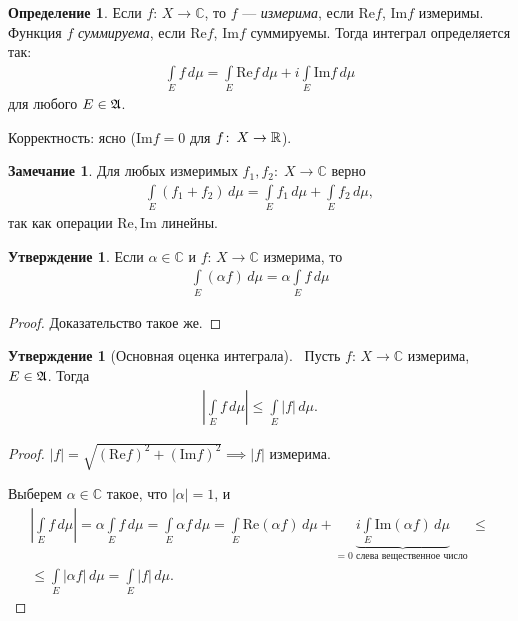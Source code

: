 \documentclass[a4paper,14pt]{extarticle}
\newcounter{theoremCnt}
\theoremstyle{definition}
\newtheorem{df}[theoremCnt]{Определение}
\theoremstyle{plain}
\theoremstyle{plain}
\theoremstyle{plain}
\theoremstyle{plain}
\theoremstyle{definition}
\theoremstyle{definition}
\newtheorem{remrk}[theoremCnt]{Замечание}
\theoremstyle{definition}
\newtheorem{claim}[theoremCnt]{Утверждение}
\theoremstyle{definition}
\theoremstyle{definition}
\theoremstyle{definition}
\theoremstyle{plain}
\theoremstyle{plain}
\theoremstyle{plain}
\theoremstyle{plain}
\theoremstyle{definition}
\theoremstyle{definition}
\theoremstyle{definition}
\theoremstyle{definition}
\theoremstyle{definition}
\newcommand{\R}{\ensuremath \mathbb{R}}
\newcommand{\A}{\ensuremath \mathfrak{A}}
\begin{document}
\begin{df}
 Если  $f \colon\, X \to \mathbb{C} $, то $f$ --- \textit{измерима}, если $\mathrm{Re} f$,  $\mathrm{Im} f$ измеримы. Функция  $f$ \textit{суммируема}, если $\mathrm{Re} f$,  $\mathrm{Im} f$ суммируемы. Тогда интеграл определяется так: \begin{align*}
  \int\limits_E f \, d\mu = \int\limits_E \mathrm{Re} f \, d\mu + i \int\limits_E \mathrm{Im} f \,d\mu
 \end{align*} для любого $E \in \A$.

 Корректность: ясно ($\mathrm{Im} f = 0$ для  $f \colon\, X \to \R  $).
\end{df}
\begin{remrk}
 Для любых измеримых $f_1, f_2 \colon\; X \to \mathbb{C}$ верно
 \begin{align*}
  \int\limits_E (f_1 + f_2) \, d\mu = \int\limits_E f_1 \,d\mu + \int\limits_E f_2 \,d\mu
 ,\end{align*}  так как операции $\mathrm{Re}, \mathrm{Im}$ линейны.
\end{remrk}
\begin{claim}
 Если $\alpha \in \mathbb{C}$ и $f \colon\, X \to \mathbb{C} $ измерима, то \begin{align*}
  \int\limits_E (\alpha f) \, d\mu = \alpha \int\limits_E f\,d\mu
 \end{align*} 
\end{claim}
\begin{proof}
 Доказательство такое же.
\end{proof}
\begin{claim}[Основная оценка интеграла]\
 Пусть $f \colon\, X \to \mathbb{C} $ измерима, $E \in \A$. Тогда \begin{align*}
  \left| \int\limits_E f \, d\mu \right| \leqslant \int\limits_E \left| f \right| \,d\mu
 .\end{align*} 
\end{claim}
\begin{proof}
 $\left| f \right| = \sqrt{(\mathrm{Re} f)^{2} + (\mathrm{Im} f)^{2}} \implies \left| f \right| $ измерима.

 Выберем $\alpha \in \mathbb{C}$ такое, что $\left| \alpha \right| = 1$, и \begin{align*}
  \left| \int\limits_E f\,d\mu \right| = \alpha \int\limits_E f\,d\mu = \int\limits_E \alpha f \,d\mu = \int\limits_E \mathrm{Re}(\alpha f) \,d\mu + \underbrace{i \int\limits_E \mathrm{Im}(\alpha f) \, d\mu}_{= 0 \text{ слева вещественное число }} \leqslant \\ \leqslant \int\limits_E \left| \alpha f \right| \,d\mu = \int\limits_E \left| f \right| \,d\mu
 .\end{align*} 
\end{proof}
\end{document}
